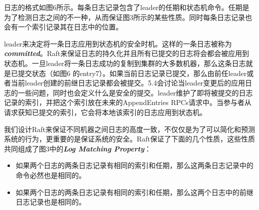 \documentclass[journal]{IEEEtran}
\begin{document}
日志的格式如图6所示。每条日志记录包含了leader的任期和状态机命令。任期是为了检测日志之间的不一种，从而保证图3所示的某些性质。同时每条日志记录也会有一个索引记录其在日志中的位置。

leader来决定将一条日志应用到状态机的安全时机。这样的一条日志被称为\textbf{\textit{committed}}。Raft来保证日志的持久化并且所有已提交的日志将会都会被应用到状态机。一旦leader将一条日志成功的复制到集群的大多数机器，那么这条日志就是已提交状态（如图6 的entry7）。如果当前日志记录已提交，那么由前任leader或者当前leader创建的前继日志记录都会被提交。5.4会讨论当leader变更后的应用日志的一些问题，同时也会定义什么是安全的提交。leader维护了即将被提交的日志记录的索引，并把这个索引放在未来的AppendEntries RPCs请求中。当参与者从请求获知已提交的索引，它会将本地该索引的日志应用到状态机。

我们设计Raft来保证不同机器之间日志的高度一致，不仅仅是为了可以简化和预测系统的行为，更重要的是保证系统的安全。Raft保证了下面的几个性质，这些性质共同组成了图3中的\textbf{\textit{Log Matching Property}}：
\begin{itemize}
\item 如果两个日志的两条日志记录有相同的索引和任期，那么这两条日志记录中的命令必然也是相同的。
\item 如果两个日志的两条日志记录有相同的索引和任期，那么这两个日志中的前继日志记录也是相同的。
\end{itemize}
\end{document}
